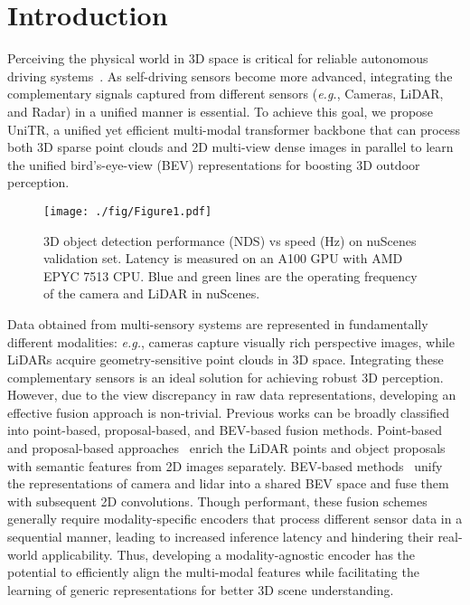\documentclass[10pt,twocolumn,letterpaper]{article}
\begin{document}
\vspace{-5pt}
\section{Introduction}
Perceiving the physical world in 3D space is critical for reliable autonomous driving systems~\cite{bansal2018chauffeurnet, wang2019monocular}. As self-driving sensors become more advanced, integrating the complementary signals captured from different sensors (\textit{e.g.}, Cameras, LiDAR, and Radar) in a unified manner is essential. To achieve this goal, we propose UniTR, a unified yet efficient multi-modal transformer backbone that can process both 3D sparse point clouds and 2D multi-view dense images in parallel to learn the unified bird's-eye-view (BEV) representations for boosting 3D outdoor perception.

\begin{figure}[t]
\begin{center}
   \texttt{[image: ./fig/Figure1.pdf]}
\end{center}
\vspace{-10pt}
\caption{3D object detection performance (NDS) vs speed (Hz) on nuScenes~\cite{caesar2020nuscenes} validation set. Latency is measured on an A100 GPU with AMD EPYC 7513 CPU. {\color{SkyBlue}Blue} and {\color{Green}green} lines are the operating frequency of the camera and LiDAR in nuScenes.
}
\label{fig:speed}
\vspace{-12pt}
\end{figure}

Data obtained from multi-sensory systems are represented in fundamentally different modalities: \textit{e.g.}, cameras capture visually rich perspective images, while LiDARs acquire geometry-sensitive point clouds in 3D space.  Integrating these complementary sensors is an ideal solution for achieving robust 3D perception. However, due to the view discrepancy in raw data representations, developing an effective fusion approach is non-trivial. Previous works can be broadly classified into point-based, proposal-based, and BEV-based fusion methods. Point-based~\cite{sindagi2019mvx,vora2020pointpainting,huang2020epnet,yin2021cvpr,wang2021pointaugmenting} and proposal-based approaches~\cite{chen2017multi,yoo20203d,bai2022transfusion,li2022deepfusion,chen2022futr3d,yang2022boosting,li2023fully} enrich the LiDAR points and object proposals with semantic features from 2D images separately. BEV-based methods~\cite{liu2022bevfusion,liang2022bevfusion} unify the representations of camera and lidar into a shared BEV space and fuse them with subsequent 2D convolutions. Though performant, these fusion schemes generally require modality-specific encoders that process different sensor data in a sequential manner, leading to increased inference latency and hindering their real-world applicability. Thus, developing a modality-agnostic encoder has the potential to efficiently align the multi-modal features while facilitating the learning of generic representations for better 3D scene understanding.
\end{document}
